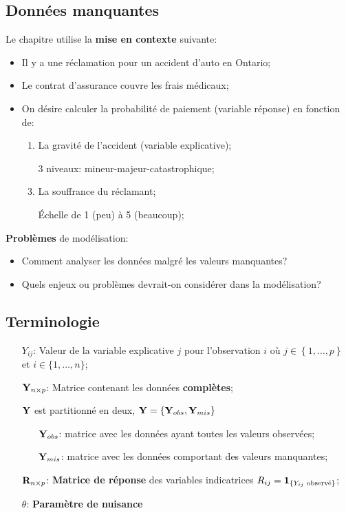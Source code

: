 \documentclass[10pt, french]{article}
\begin{document}
\begin{multicols*}{3}
\section{Données manquantes}

Le chapitre utilise la \textbf{mise en contexte} suivante:
\begin{itemize}
	\item	Il y a une réclamation pour un accident d'auto en Ontario;
	\item	Le contrat d'assurance couvre les frais médicaux;
	\item	On désire calculer la probabilité de paiement (variable réponse) en fonction de:
		\begin{enumerate}
		\item	La gravité de l'accident (variable explicative);
		\item[]	3 niveaux: mineur-majeur-catastrophique;
		\item	La souffrance du réclamant;
		\item[]	Échelle de 1 (peu) à 5 (beaucoup);
		\end{enumerate}
\end{itemize}

\textbf{Problèmes} de modélisation:
\begin{itemize}
	\item	Comment analyser les données malgré les valeurs manquantes?
	\item	Quels enjeux ou problèmes devrait-on considérer dans la modélisation?
\end{itemize}

\subsection*{Terminologie}

\begin{definition}[Notation]
\begin{itemize}
	\item[$Y_{ij}$:] Valeur de la variable explicative $j$ pour l'observation $i$ où	$j \in \left\{ 1, \dots, p \right\}$ et $i \in \{1, \dots, n\}$;
	\item[$\mathbf{Y}_{n \times p}$:] Matrice contenant les données \textbf{complètes};
	\item[]	$\mathbf{Y}$ est partitionné en deux, $\mathbf{Y} = \left\{ \mathbf{Y}_{obs}, \mathbf{Y}_{mis} \right\}$
		\begin{itemize}
		\item[$\mathbf{Y}_{obs}$:] matrice avec les données ayant toutes les valeurs observées;
		\item[$\mathbf{Y}_{mis}$:] matrice avec les données comportant des valeurs manquantes;
		\end{itemize}
	\item[$\mathbf{R}_{n \times p}$:]	\textbf{Matrice de réponse} des variables indicatrices $R_{ij} = \mathbf{1}_{\{Y_{ij} \text{ observé}\}}$;
	\item[$\theta$:] \textbf{Paramètre de nuisance}
\end{itemize}
\end{definition}


\end{multicols*}
\end{document}
